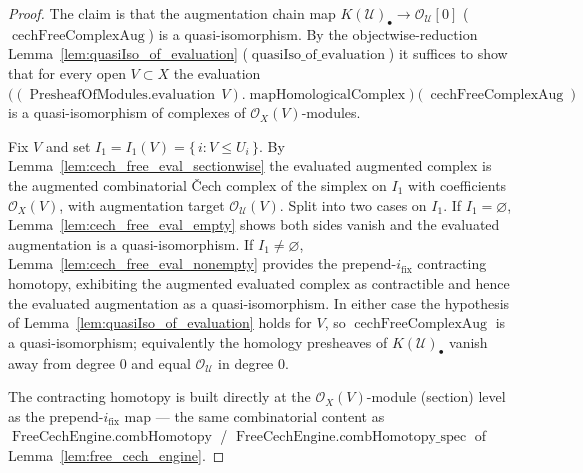 \begin{proof}
  The claim is that the augmentation chain map
  \(K(\mathcal{U})_\bullet \to \mathcal{O}_{\mathcal{U}}[0]\)
  (\(\operatorname{cechFreeComplexAug}\)) is a quasi-isomorphism. By the
  objectwise-reduction Lemma~\ref{lem:quasiIso_of_evaluation}
  (\(\operatorname{quasiIso\_of\_evaluation}\)) it suffices to show that for every open
  \(V \subset X\) the evaluation
  \(\bigl((\operatorname{PresheafOfModules.evaluation}\, V).
  \operatorname{mapHomologicalComplex}\bigr)(\operatorname{cechFreeComplexAug})\) is a
  quasi-isomorphism of complexes of \(\mathcal{O}_X(V)\)-modules.

  Fix \(V\) and set \(I_1 = I_1(V) = \{\,i : V \leq U_i\,\}\). By
  Lemma~\ref{lem:cech_free_eval_sectionwise} the evaluated augmented complex is the
  augmented combinatorial {\v C}ech complex of the simplex on \(I_1\) with
  coefficients \(\mathcal{O}_X(V)\), with augmentation target
  \(\mathcal{O}_{\mathcal{U}}(V)\). Split into two cases on \(I_1\). If
  \(I_1 = \varnothing\), Lemma~\ref{lem:cech_free_eval_empty} shows both sides vanish
  and the evaluated augmentation is a quasi-isomorphism. If \(I_1 \neq \varnothing\),
  Lemma~\ref{lem:cech_free_eval_nonempty} provides the prepend-\(i_{\mathrm{fix}}\)
  contracting homotopy, exhibiting the augmented evaluated complex as contractible and
  hence the evaluated augmentation as a quasi-isomorphism. In either case the
  hypothesis of Lemma~\ref{lem:quasiIso_of_evaluation} holds for \(V\), so
  \(\operatorname{cechFreeComplexAug}\) is a quasi-isomorphism; equivalently the
  homology presheaves of \(K(\mathcal{U})_\bullet\) vanish away from degree \(0\) and
  equal \(\mathcal{O}_{\mathcal{U}}\) in degree \(0\).

  The contracting homotopy is built directly at the \(\mathcal{O}_X(V)\)-module
  (section) level as the prepend-\(i_{\mathrm{fix}}\) map — the same combinatorial
  content as \(\operatorname{FreeCechEngine.combHomotopy}\) /
  \(\operatorname{FreeCechEngine.combHomotopy\_spec}\) of
  Lemma~\ref{lem:free_cech_engine}.
\end{proof}

